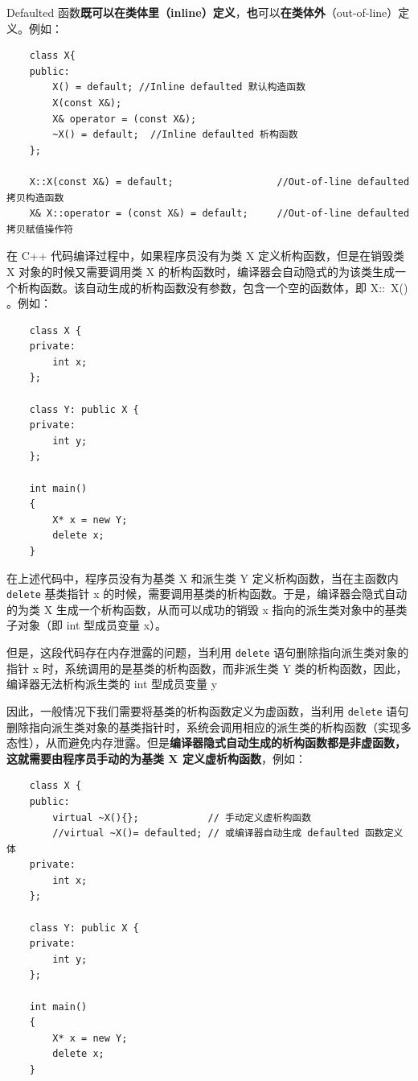 \documentclass[UTF8,a4paper,12pt]{ctexbook} %
\begin{document}
				Defaulted 函数\textbf{既可以在类体里（inline）定义}，\textbf{也}可以\textbf{在类体外}（out-of-line）定义。例如：
				\begin{lstlisting}
	class X{ 
	public:  
		X() = default; //Inline defaulted 默认构造函数
		X(const X&); 
		X& operator = (const X&); 
		~X() = default;  //Inline defaulted 析构函数
	}; 
	
	X::X(const X&) = default;                  //Out-of-line defaulted 拷贝构造函数
	X& X::operator = (const X&) = default;     //Out-of-line defaulted 拷贝赋值操作符				
				\end{lstlisting}
				
				在 C++ 代码编译过程中，如果程序员没有为类 X 定义析构函数，但是在销毁类 X 对象的时候又需要调用类 X 的析构函数时，编译器会自动隐式的为该类生成一个析构函数。该自动生成的析构函数没有参数，包含一个空的函数体，即 X::~X(){ }。例如：
				\begin{lstlisting}
	class X { 
	private: 
		int x; 
	}; 
	
	class Y: public X { 
	private: 
		int y; 
	}; 
	
	int main()
	{ 
		X* x = new Y; 
		delete x; 
	}				
				\end{lstlisting}
				
				 在上述代码中，程序员没有为基类 X 和派生类 Y 定义析构函数，当在主函数内 \verb|delete| 基类指针 x 的时候，需要调用基类的析构函数。于是，编译器会隐式自动的为类 X 生成一个析构函数，从而可以成功的销毁 x 指向的派生类对象中的基类子对象（即 int 型成员变量 x）。
				 
				 但是，这段代码存在内存泄露的问题，当利用 \verb|delete| 语句删除指向派生类对象的指针 x 时，系统调用的是基类的析构函数，而非派生类 Y 类的析构函数，因此，编译器无法析构派生类的 int 型成员变量 y	
				 
				 因此，一般情况下我们需要将基类的析构函数定义为虚函数，当利用 \verb|delete| 语句删除指向派生类对象的基类指针时，系统会调用相应的派生类的析构函数（实现多态性），从而避免内存泄露。但是\textbf{编译器隐式自动生成的析构函数都是非虚函数，这就需要由程序员手动的为基类 X 定义虚析构函数}，例如：
				 \begin{lstlisting}
	class X { 
	public: 
		virtual ~X(){};     	   // 手动定义虚析构函数
		//virtual ~X()= defaulted; // 或编译器自动生成 defaulted 函数定义体
	private: 
		int x; 
	}; 
	
	class Y: public X { 
	private: 
		int y; 
	}; 
	
	int main()
	{ 
		X* x = new Y; 
		delete x; 
	}				 	
				 \end{lstlisting}
				 
\end{document}
